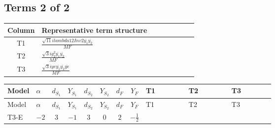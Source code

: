 \documentclass[8pt]{article}
\begin{document}
\begin{landscape}
\subsection*{Terms 2 of 2}
\begin{center}
\begin{tabular}{@{}c >{\raggedright\arraybackslash}p{0.82\linewidth}@{}}
\toprule
Column & Representative term structure \\
\midrule
T1 & \(\displaystyle \frac{\sqrt{11} i lambda12Inv2 \overline{y_{1}} \overline{y_{2}}}{MF}\) \\
\midrule
T2 & \(\displaystyle \frac{\sqrt{3} i g_{2}^{2} \overline{y_{1}} \overline{y_{2}}}{MF}\) \\
\midrule
T3 & \(\displaystyle \frac{\sqrt{3} i ye \overline{y_{1}} \overline{y_{2}} \overline{ye}}{MF}\) \\
\midrule
\bottomrule
\end{tabular}
\end{center}
\smallskip
\tiny
\begin{longtable}{@{}llcccccc >{\raggedright\arraybackslash}p{0.21\linewidth} >{\raggedright\arraybackslash}p{0.21\linewidth} >{\raggedright\arraybackslash}p{0.21\linewidth}@{}}
\toprule
Model & $\alpha$ & $d_{S_1}$ & $Y_{S_1}$ & $d_{S_2}$ & $Y_{S_2}$ & $d_F$ & $Y_F$ & T1 & T2 & T3 \\
\midrule
\endfirsthead
\toprule
Model & $\alpha$ & $d_{S_1}$ & $Y_{S_1}$ & $d_{S_2}$ & $Y_{S_2}$ & $d_F$ & $Y_F$ & T1 & T2 & T3 \\
\midrule
\endhead
T3-E & $-2$ & $3$ & $-1$ & $3$ & $0$ & $2$ & $-\frac{1}{2}$ & \scriptsize\adjustbox{max width=\linewidth}{$\begin{gathered} \frac{3 \sqrt{11} i lambda12Inv2 \overline{y_{1}} \overline{y_{2}}}{22 MF}\end{gathered}$} & \scriptsize\adjustbox{max width=\linewidth}{$\begin{gathered} \frac{11 \sqrt{3} i g_{2}^{2} \overline{y_{1}} \overline{y_{2}}}{8 MF}\end{gathered}$} & \scriptsize\adjustbox{max width=\linewidth}{$\begin{gathered} - \frac{\sqrt{3} i ye \overline{y_{1}} \overline{y_{2}} \overline{ye}}{12 MF}\end{gathered}$} \\
\midrule
\bottomrule
\end{longtable}
\end{landscape}
\end{document}
